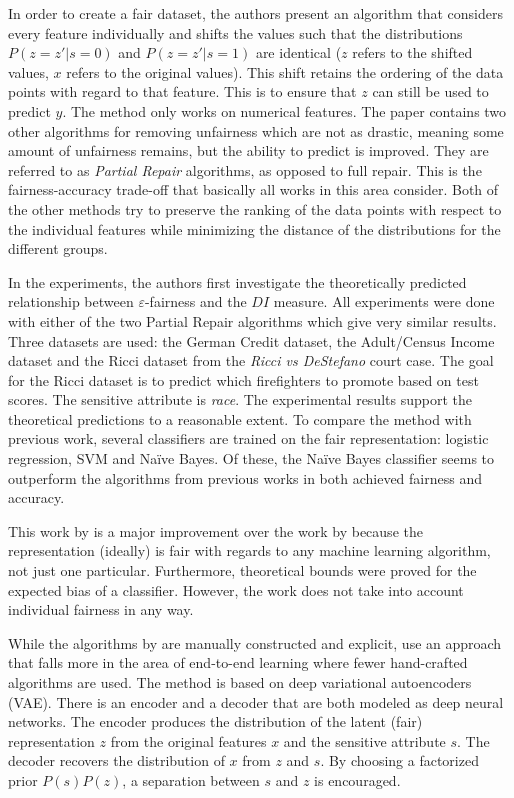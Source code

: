 In order to create a fair dataset,
the authors present an algorithm that considers every feature individually
and shifts the values such that the distributions \(P(z=z'|s=0)\) and \(P(z=z'|s=1)\) are identical
(\(z\) refers to the shifted values, \(x\) refers to the original values).
This shift retains the ordering of the data points with regard to that feature.
This is to ensure that \(z\) can still be used to predict \(y\).
The method only works on numerical features.
The paper contains two other algorithms for removing unfairness which are not as drastic,
meaning some amount of unfairness remains, but the ability to predict is improved.
They are referred to as \emph{Partial Repair} algorithms, as opposed to full repair.
This is the fairness-accuracy trade-off that basically all works in this area consider.
Both of the other methods try to preserve the ranking of the data points
with respect to the individual features
while minimizing the distance of the distributions for the different groups.

In the experiments, the authors first investigate the theoretically predicted relationship
between \(\varepsilon\)-fairness and the \(DI\) measure.
All experiments were done with either of the two Partial Repair algorithms
which give very similar results.
Three datasets are used:
the German Credit dataset, the Adult/Census Income dataset
and the Ricci dataset from the \emph{Ricci vs DeStefano} court case.
The goal for the Ricci dataset is to predict which firefighters to promote based on test scores.
The sensitive attribute is \emph{race}.
The experimental results support the theoretical predictions to a reasonable extent.
To compare the method with previous work,
several classifiers are trained on the fair representation:
logistic regression, SVM and Na\"ive Bayes.
Of these, the Na\"ive Bayes classifier seems to outperform the algorithms from previous works
\citep{kamiran2009classifying,kamishima2011fairness,zemel2013learning}
in both achieved fairness and accuracy.

This work by \citet{feldman2015certifying} is a major improvement over the work by \citet{zemel2013learning}
because the representation (ideally) is fair with regards to any machine learning algorithm, not just one particular.
Furthermore, theoretical bounds were proved for the expected bias of a classifier.
However, the work does not take into account individual fairness in any way.

While the algorithms by \citet{feldman2015certifying} are manually constructed and explicit,
\citet{louizos2015variational} use an approach
that falls more in the area of end-to-end learning where fewer hand-crafted algorithms are used.
The method is based on deep variational autoencoders (VAE).
There is an encoder and a decoder that are both modeled as deep neural networks.
The encoder produces the distribution of the latent (fair) representation \(z\)
from the original features \(x\) and the sensitive attribute \(s\).
The decoder recovers the distribution of \(x\) from \(z\) and \(s\).
By choosing a factorized prior \(P(s)P(z)\), a separation between \(s\) and \(z\) is encouraged.

